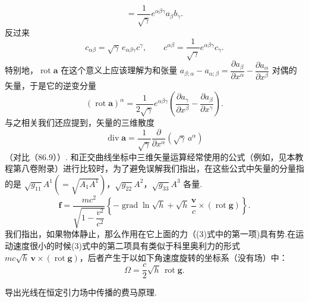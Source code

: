 \begin{xiti}
{\begin{equation*}
  =\frac{1}{\sqrt{\gamma}}e^{\alpha\beta\gamma}a_{\beta}b_{\gamma}.
\end{equation*}
反过来
\begin{equation*}
  c_{\alpha\beta}=\sqrt{\gamma}\,e_{\alpha\beta\gamma}c^{\gamma},\qquad
  c^{\alpha\beta}=\frac{1}{\sqrt{\gamma}}e^{\alpha\beta\gamma}c_{\gamma}.
\end{equation*}
特别地，$\operatorname{rot}\boldsymbol{a}$ 在这个意义上应该理解为和张量
$a_{\beta;\alpha}-a_{\alpha;\beta}
=\dfrac{\partial a_{\beta}}{\partial x^{\alpha}}
-\dfrac{\partial a_{\alpha}}{\partial x^{\beta}}$
对偶的矢量，于是它的逆变分量
\begin{equation*}
  (\operatorname{rot}\boldsymbol{a})^{\alpha}
  =\frac{1}{2\sqrt{\gamma}}e^{\alpha\beta\gamma}
  \left(\frac{\partial a_{\gamma}}{\partial x^{\beta}}
  -\frac{\partial a_{\beta}}{\partial x^{\gamma}}\right).
\end{equation*}
与之相关我们还应提到，矢量的三维散度
\begin{equation*}
  \operatorname{div}\boldsymbol{a}
  =\frac{1}{\sqrt{\gamma}}\frac{\partial}{\partial x^{\alpha}}
  (\sqrt{\gamma}\,a^{\alpha})
\end{equation*}
（对比（86.9））.
和正交曲线坐标中三维矢量运算经常使用的公式（例如，见本教程第八卷附录）进行比较时，为了避免误解我们指出，在这些公式中矢量的分量指的是 $\sqrt{g_{11}}A^1(=\sqrt{A_1A^1})$，$\sqrt{g_{22}}A^2$，$\sqrt{g_{33}}A^3$ 各量.}
\begin{equation*}
  \boldsymbol{f}=\frac{mc^2}{\sqrt{1-\dfrac{v^2}{c^2}}}
  \left\{-\operatorname{grad}\ln\sqrt{h}
  +\sqrt{h}\,\frac{\boldsymbol{v}}{c}
  \times(\operatorname{rot}\boldsymbol{g})\right\}.
\tag{3}\end{equation*}
我们指出，如果物体静止，那么作用在它上面的力（(3)式中的第一项)具有势.在运动速度很小的时候(3)式中的第二项具有类似于科里奥利力的形式 $mc\sqrt{h}\,\boldsymbol{v}\times(\operatorname{rot}\boldsymbol{g})$，后者产生于以如下角速度旋转的坐标系（没有场）中：
\begin{equation*}
  \varOmega=\frac{c}{2}\sqrt{h}\,\operatorname{rot}\boldsymbol{g}.
\end{equation*}

\quad 导出光线在恒定引力场中传播的费马原理.


\end{xiti}
